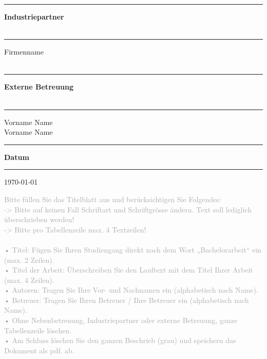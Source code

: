 \begin{titlepage}
\begin{minipage}[b]{0.91\textwidth}
	\begin{minipage}[b]{0.27\textwidth}
	\hrule\vskip 0.5cm
		\textbf{Industriepartner}\\
		\\
	\end{minipage}
	\begin{minipage}[b]{0.03\textwidth}
	\hskip 0.5cm
	\end{minipage}
	\begin{minipage}[b]{0.7\textwidth}
	\hrule\vskip 0.5cm
		Firmenname\\
		\\
	\end{minipage}

	\begin{minipage}[b]{0.27\textwidth}
	\hrule\vskip 0.5cm
		\textbf{Externe Betreuung}\\
		\\
	\end{minipage}
	\begin{minipage}[b]{0.03\textwidth}
	\hskip 0.5cm
	\end{minipage}
	\begin{minipage}[b]{0.7\textwidth}
	\hrule\vskip 0.5cm
		Vorname Name\\
		Vorname Name\\
	\end{minipage}

	\begin{minipage}[b]{0.27\textwidth}
	\hrule\vskip 0.5cm
		\textbf{Datum}
	\end{minipage}
	\begin{minipage}[b]{0.03\textwidth}
	\hskip 0.5cm
	\end{minipage}
	\begin{minipage}[b]{0.7\textwidth}
	\hrule\vskip 0.5cm
		\today
	\end{minipage}
\end{minipage}
\vskip 0.5cm


\textcolor{darkgray}{
Bitte füllen Sie das Titelblatt aus und berücksichtigen Sie Folgendes:\\
 -> Bitte auf keinen Fall Schriftart und Schriftgrösse ändern. Text soll lediglich überschrieben werden!\\
 -> Bitte pro Tabellenzeile max. 4 Textzeilen!\\
\\
•	Titel: Fügen Sie Ihren Studiengang direkt nach dem Wort „Bachelorarbeit“ ein (max. 2 Zeilen).\\
•	Titel der Arbeit: Überschreiben Sie den Lauftext mit dem Titel Ihrer Arbeit (max. 4 Zeilen).\\
•	Autoren: Tragen Sie Ihre Vor- und Nachnamen ein (alphabetisch nach Name).\\
•	Betreuer: Tragen Sie Ihren Betreuer / Ihre Betreuer ein (alphabetisch nach Name).\\
•	Ohne Nebenbetreuung, Industriepartner oder externe Betreuung, ganze Tabellenzeile löschen.\\
•	Am Schluss löschen Sie den ganzen Beschrieb (grau) und speichern das Dokument als pdf. ab.
}

\end{titlepage}
